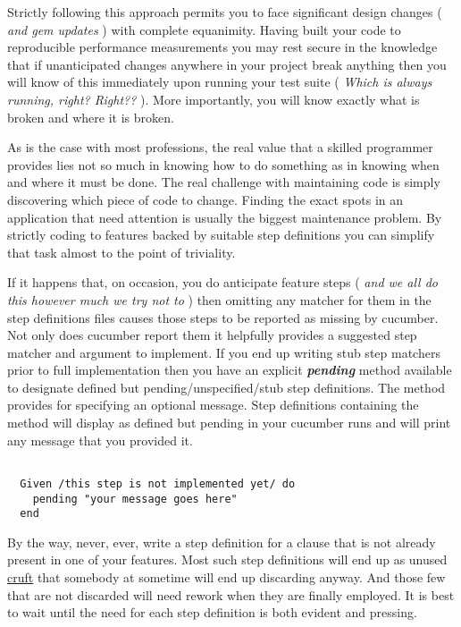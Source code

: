 Strictly following this approach permits you to face significant design changes ( \emph{and gem updates} ) with complete equanimity. Having built your code to reproducible performance measurements you may rest secure in the knowledge that if unanticipated changes anywhere in your project break anything then you will know of this immediately upon running your test suite ( \emph{Which is always running, right? Right??} ).  More importantly, you will know exactly what is broken and where it is broken.

As is the case with most professions, the real value that a skilled programmer provides lies not so much in knowing how to do something as in knowing when and where it must be done.  The real challenge with maintaining code is simply discovering which piece of code to change.  Finding the exact spots in an application that need attention is usually the biggest maintenance problem.  By strictly coding to features backed by suitable step definitions you can simplify that task almost to the point of triviality.

If it happens that, on occasion, you do anticipate feature steps ( \emph{and we all do this however much we try not to} ) then omitting any matcher for them in the step definitions files causes those steps to be reported as missing by cucumber. Not only does cucumber report them it helpfully provides a suggested step matcher and argument to implement.  If you end up writing stub step matchers prior to full implementation then you have an explicit \textbf{\emph{pending}} method available to designate defined but pending/unspecified/stub step definitions.  The \verb@pending@ method provides for specifying an optional message.  Step definitions containing the \verb@pending@ method will display as defined but pending in your cucumber runs and will print any message that you provided it.
\begin{verbatim}

  Given /this step is not implemented yet/ do
    pending "your message goes here"
  end

\end{verbatim}

By the way, never, ever, write a step definition for a clause that is not already present in one of your features.  Most such step definitions will end up as unused \href{http://en.wikipedia.org/wiki/Cruft}{cruft} that somebody at sometime will end up discarding anyway.   And those few that are not discarded will need rework when they are finally employed.  It is best to wait until the need for each step definition is both evident and pressing.

